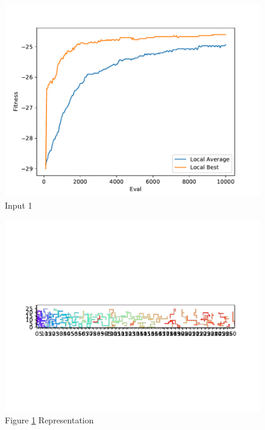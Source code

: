 \documentclass{standalone}
\begin{document}
\begin{figure}[!htb]
	\caption{Input 1}
	\label{fig:graph_1018}
	\includegraphics[width=\textwidth]{../graphs/graphs/1018.pdf}
\end{figure}


\begin{figure}[!htb]
	\caption{Figure \ref{fig:graph_1018} Representation}
	\label{fig:picture_1018}
	\includegraphics[width=\textwidth]{../graphs/picture/1018.pdf}
\end{figure}
\end{document}
